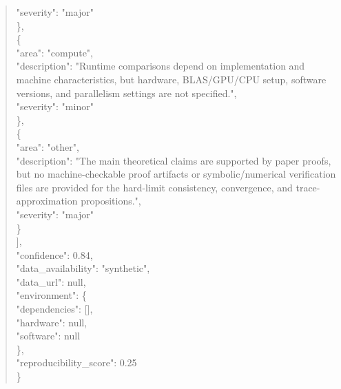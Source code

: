 \documentclass[11pt]{article}
\begin{document}
\begin{quote}
      "severity": "major"\\
    \},\\
    \{\\
      "area": "compute",\\
      "description": "Runtime comparisons depend on implementation and machine characteristics, but hardware, BLAS/GPU/CPU setup, software versions, and parallelism settings are not specified.",\\
      "severity": "minor"\\
    \},\\
    \{\\
      "area": "other",\\
      "description": "The main theoretical claims are supported by paper proofs, but no machine-checkable proof artifacts or symbolic/numerical verification files are provided for the hard-limit consistency, convergence, and trace-approximation propositions.",\\
      "severity": "major"\\
    \}\\
  ],\\
  "confidence": 0.84,\\
  "data\_availability": "synthetic",\\
  "data\_url": null,\\
  "environment": \{\\
    "dependencies": [],\\
    "hardware": null,\\
    "software": null\\
  \},\\
  "reproducibility\_score": 0.25\\
\}\\
\end{quote}
\end{document}
